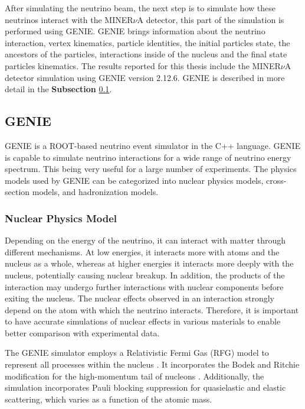 After simulating the neutrino beam, the next step is to simulate how these neutrinos interact with the MINER$\nu$A detector, this part of the simulation is performed using GENIE\cite{Genie}. GENIE brings information about the neutrino interaction, vertex kinematics, particle identities, the initial particles state, the ancestors of the particles, interactions inside of the nucleus and the final state particles kinematics. The results reported for this thesis include the MINER$\nu$A detector simulation using GENIE version 2.12.6. GENIE is described in more detail in the \textbf{Subsection} \ref{Cap:Simulation:GENIE}.

\subsection{GENIE}
\label{Cap:Simulation:GENIE}
GENIE is a ROOT-based neutrino event simulator in the C++ language. GENIE is capable to simulate neutrino interactions for a wide range of neutrino energy spectrum. This being very useful for a large number of experiments. The physics models used by GENIE can be categorized into nuclear physics models, cross-section models, and hadronization models.

\subsubsection{Nuclear Physics Model}
\label{Cap:Simulation:GENIE:NuclearPhysicsModel}

Depending on the energy of the neutrino, it can interact with matter through different mechanisms. At low energies, it interacts more with atoms and the nucleus as a whole, whereas at higher energies it interacts more deeply with the nucleus, potentially causing nuclear breakup. In addition, the products of the interaction may undergo further interactions with nuclear components before exiting the nucleus. The nuclear effects observed in an interaction strongly depend on the atom with which the neutrino interacts. Therefore, it is important to have accurate simulations of nuclear effects in various materials to enable better comparison with experimental data.

The GENIE simulator employs a Relativistic Fermi Gas (RFG) model to represent all processes within the nucleus \cite{RFGPhysRevC.80.065501}. It incorporates the Bodek and Ritchie modification for the high-momentum tail of nucleons \cite{BodekRichiePhysRevD.24.1400}. Additionally, the simulation incorporates Pauli blocking suppression for quasielastic and elastic scattering, which varies as a function of the atomic mass.

